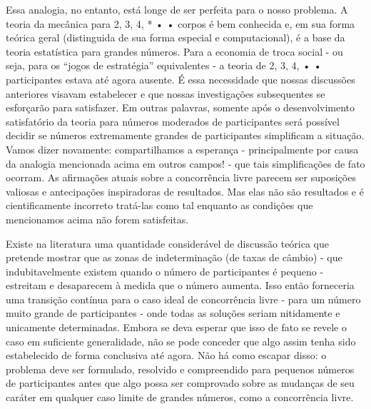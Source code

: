 \documentclass[a4paper,12pt]{article}[abntex2]
\begin{document}
Essa analogia, no entanto, está longe de ser perfeita para o nosso problema. A teoria da mecânica para 2, 3, 4, * • • corpos é bem conhecida e, em sua forma teórica geral (distinguida de sua forma especial e computacional), é a base da teoria estatística para grandes números. Para a economia de troca social - ou seja, para os “jogos de estratégia” equivalentes - a teoria de 2, 3, 4, • • participantes estava até agora ausente. É essa necessidade que nossas discussões anteriores visavam estabelecer e que nossas investigações subsequentes se esforçarão para satisfazer. Em outras palavras, somente após o desenvolvimento satisfatório da teoria para números moderados de participantes será possível decidir se números extremamente grandes de participantes simplificam a situação. Vamos dizer novamente: compartilhamos a esperança - principalmente por causa da analogia mencionada acima em outros campos! - que tais simplificações de fato ocorram. As afirmações atuais sobre a concorrência livre parecem ser suposições valiosas e antecipações inspiradoras de resultados. Mas elas não são resultados e é cientificamente incorreto tratá-las como tal enquanto as condições que mencionamos acima não forem satisfeitas.

Existe na literatura uma quantidade considerável de discussão teórica que pretende mostrar que as zonas de indeterminação (de taxas de câmbio) - que indubitavelmente existem quando o número de participantes é pequeno - estreitam e desaparecem à medida que o número aumenta. Isso então forneceria uma transição contínua para o caso ideal de concorrência livre - para um número muito grande de participantes - onde todas as soluções seriam nitidamente e unicamente determinadas. Embora se deva esperar que isso de fato se revele o caso em suficiente generalidade, não se pode conceder que algo assim tenha sido estabelecido de forma conclusiva até agora. Não há como escapar disso: o problema deve ser formulado, resolvido e compreendido para pequenos números de participantes antes que algo possa ser comprovado sobre as mudanças de seu caráter em qualquer caso limite de grandes números, como a concorrência livre.
\end{document}

